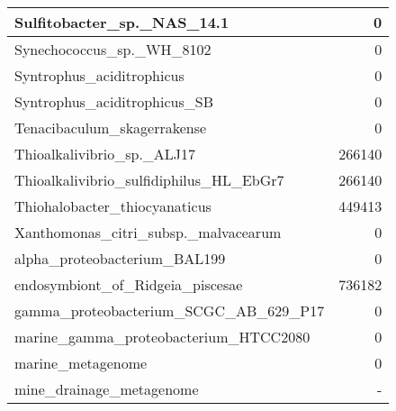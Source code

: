 \documentclass[12pt,a4paper]{article}
\begin{document}
\begin{table}[ht]
\begin{center}
\begin{tabular}{|l*{1}{|r}|}
Sulfitobacter\_sp.\_NAS\_14.1 & 0 \\ \hline
Synechococcus\_sp.\_WH\_8102 & 0 \\ \hline
Syntrophus\_aciditrophicus & 0 \\ \hline
Syntrophus\_aciditrophicus\_SB & 0 \\ \hline
Tenacibaculum\_skagerrakense & 0 \\ \hline
Thioalkalivibrio\_sp.\_ALJ17 & 266140 \\ \hline
Thioalkalivibrio\_sulfidiphilus\_HL\_EbGr7 & 266140 \\ \hline
Thiohalobacter\_thiocyanaticus & 449413 \\ \hline
Xanthomonas\_citri\_subsp.\_malvacearum & 0 \\ \hline
alpha\_proteobacterium\_BAL199 & 0 \\ \hline
endosymbiont\_of\_Ridgeia\_piscesae & 736182 \\ \hline
gamma\_proteobacterium\_SCGC\_AB\_629\_P17 & 0 \\ \hline
marine\_gamma\_proteobacterium\_HTCC2080 & 0 \\ \hline
marine\_metagenome & 0 \\ \hline
mine\_drainage\_metagenome & - \\ \hline
\end{tabular}
\end{center}
\end{table}
\end{document}
